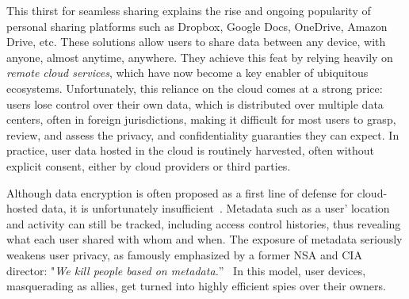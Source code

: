 This thirst for seamless sharing explains the rise and ongoing popularity
of personal sharing platforms such as Dropbox, Google Docs,
OneDrive, Amazon Drive, etc. These solutions allow users to share data between any device, with anyone, almost
anytime, anywhere. They achieve this feat by relying heavily on
\emph{remote cloud services}, which have now become a key enabler of ubiquitous ecosystems. 
Unfortunately, this reliance on the cloud comes at a strong price: 
users lose control over their own data, which is distributed over
multiple data centers, often in foreign jurisdictions, making it difficult for most users to grasp, review, and assess the privacy, and
confidentiality guaranties they can expect. In practice, user data hosted in the cloud is routinely harvested, often without explicit
consent, either by cloud providers or third parties.

Although data encryption is often proposed as a first line of defense for cloud-hosted data, it is unfortunately  insufficient~\cite{granick_2017, HooffLZZ15, HarnikPS10}. Metadata such as a user'
location and activity can still be tracked, including access
control histories, thus revealing what each user shared with whom and when. 
The exposure of metadata seriously weakens user privacy, as famously emphasized by a former NSA and CIA director: "\emph{We kill people based on metadata.}''~\cite{NaughtonTheGuardian2016} 
In this model, user devices, masquerading as allies, get turned into %
highly efficient spies over their owners. 

